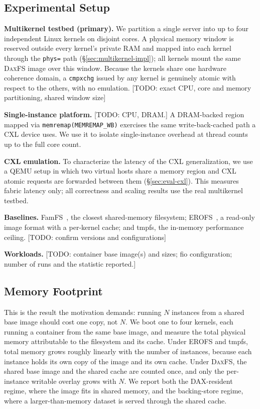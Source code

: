 \documentclass[letterpaper,twocolumn,10pt]{article}
\newcommand{\daxfs}{\textsc{DaxFS}\xspace}
\newcommand{\todo}[1]{[TODO: #1]}
\begin{document}
\subsection{Experimental Setup}

\textbf{Multikernel testbed (primary).}  We partition a single server
into up to four independent Linux kernels on disjoint cores.  A
physical memory window is reserved outside every kernel's private RAM
and mapped into each kernel through the \texttt{phys=} path
(\S\ref{sec:multikernel-impl}); all kernels mount the same \daxfs image
over this window.  Because the kernels share one hardware coherence
domain, a \texttt{cmpxchg} issued by any kernel is genuinely atomic
with respect to the others, with no emulation.
\todo{exact CPU, core and memory partitioning, shared window size}

\textbf{Single-instance platform.}  \todo{CPU, DRAM.}  A DRAM-backed
region mapped via \texttt{memremap(MEMREMAP\_WB)} exercises the same
write-back-cached path a CXL device uses.  We use it to isolate
single-instance overhead at thread counts up to the full core count.

\textbf{CXL emulation.}  To characterize the latency of the CXL
generalization, we use a QEMU setup in which two virtual hosts share a
memory region and CXL atomic requests are forwarded between them
(\S\ref{sec:eval-cxl}).  This measures fabric latency only; all
correctness and scaling results use the real multikernel testbed.

\textbf{Baselines.}  FamFS~\cite{groves24:Famfs}, the closest
shared-memory filesystem; EROFS~\cite{gao20:erofs}, a read-only image
format with a per-kernel cache; and tmpfs, the in-memory performance
ceiling.  \todo{confirm versions and configurations}

\textbf{Workloads.}  \todo{container base image(s) and sizes; fio
configuration; number of runs and the statistic reported.}

\subsection{Memory Footprint}
\label{sec:eval-memory}

This is the result the motivation demands: running $N$ instances from a
shared base image should cost one copy, not $N$.  We boot one to four
kernels, each running a container from the same base image, and measure
the total physical memory attributable to the filesystem and its cache.
Under EROFS and tmpfs, total memory grows roughly linearly with the
number of instances, because each instance holds its own copy of the
image and its own cache.  Under \daxfs, the shared base image and the
shared cache are counted once, and only the per-instance writable
overlay grows with $N$.  We report both the DAX-resident regime, where
the image fits in shared memory, and the backing-store regime, where a
larger-than-memory dataset is served through the shared cache.
\end{document}
